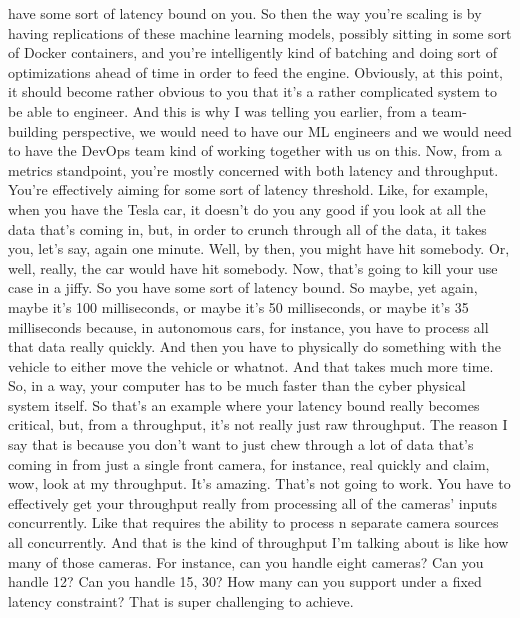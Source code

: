 {{{{{{{    have some sort of latency bound on you.
    So then the way you're scaling is by having replications of these machine
    learning models, possibly sitting in some sort of Docker containers,
    and you're intelligently kind of batching and doing
    sort of optimizations ahead of time in order to feed the engine.
    Obviously, at this point, it should become rather obvious to you
    that it's a rather complicated system to be able to engineer.
    And this is why I was telling you earlier,
    from a team-building perspective, we would need to have our ML engineers
    and we would need to have the DevOps team kind of working together
    with us on this.
    Now, from a metrics standpoint, you're mostly concerned
    with both latency and throughput.
    You're effectively aiming for some sort of latency threshold.
    Like, for example, when you have the Tesla car,
    it doesn't do you any good if you look at all the data that's coming in,
    but, in order to crunch through all of the data, it takes you,
    let's say, again one minute.
    Well, by then, you might have hit somebody.
    Or, well, really, the car would have hit somebody.
    Now, that's going to kill your use case in a jiffy.
    So you have some sort of latency bound.
    So maybe, yet again, maybe it's 100 milliseconds,
    or maybe it's 50 milliseconds, or maybe it's
    35 milliseconds because, in autonomous cars,
    for instance, you have to process all that data really quickly.
    And then you have to physically do something with the vehicle
    to either move the vehicle or whatnot.
    And that takes much more time.
    So, in a way, your computer has to be much faster
    than the cyber physical system itself.
    So that's an example where your latency bound really becomes critical,
    but, from a throughput, it's not really just raw throughput.
    The reason I say that is because you don't
    want to just chew through a lot of data that's coming in
    from just a single front camera, for instance, real quickly and claim,
    wow, look at my throughput.
    It's amazing.
    That's not going to work.
    You have to effectively get your throughput really
    from processing all of the cameras' inputs concurrently.
    Like that requires the ability to process n separate camera
    sources all concurrently.
    And that is the kind of throughput I'm talking about is like how many
    of those cameras.
    For instance, can you handle eight cameras?
    Can you handle 12?
    Can you handle 15, 30?
    How many can you support under a fixed latency constraint?
    That is super challenging to achieve.
}}}}}}}
